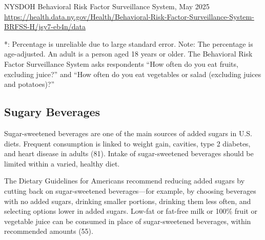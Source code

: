 \documentclass[
  english,
  letterpaper,
]{report}
\begin{document}
\begin{tcolorbox}[enhanced jigsaw, breakable, leftrule=.75mm, title=\textcolor{quarto-callout-note-color}{\faInfo}\hspace{0.5em}{Source}, bottomrule=.15mm, opacityback=0, left=2mm, colback=white, bottomtitle=1mm, coltitle=black, colbacktitle=quarto-callout-note-color!10!white, colframe=quarto-callout-note-color-frame, opacitybacktitle=0.6, toptitle=1mm, titlerule=0mm, arc=.35mm, rightrule=.15mm, toprule=.15mm]

NYSDOH Behavioral Risk Factor Surveillance System, May 2025\\
\url{https://health.data.ny.gov/Health/Behavioral-Risk-Factor-Surveillance-System-BRFSS-H/jsy7-eb4n/data}

\end{tcolorbox}

\begin{tcolorbox}[enhanced jigsaw, breakable, leftrule=.75mm, title=\textcolor{quarto-callout-note-color}{\faInfo}\hspace{0.5em}{Note}, bottomrule=.15mm, opacityback=0, left=2mm, colback=white, bottomtitle=1mm, coltitle=black, colbacktitle=quarto-callout-note-color!10!white, colframe=quarto-callout-note-color-frame, opacitybacktitle=0.6, toptitle=1mm, titlerule=0mm, arc=.35mm, rightrule=.15mm, toprule=.15mm]

*: Percentage is unreliable due to large standard error. Note: The
percentage is age-adjusted. An adult is a person aged 18 years or older.
The Behavioral Risk Factor Surveillance System asks respondents ``How
often do you eat fruits, excluding juice?'' and ``How often do you eat
vegetables or salad (excluding juices and potatoes)?''

\end{tcolorbox}

\subsection{Sugary Beverages}\label{sugary-beverages}

Sugar-sweetened beverages are one of the main sources of added sugars in
U.S. diets. Frequent consumption is linked to weight gain, cavities,
type 2 diabetes, and heart disease in adults (81). Intake of
sugar-sweetened beverages should be limited within a varied, healthy
diet.

The Dietary Guidelines for Americans recommend reducing added sugars by
cutting back on sugar-sweetened beverages---for example, by choosing
beverages with no added sugars, drinking smaller portions, drinking them
less often, and selecting options lower in added sugars. Low-fat or
fat-free milk or 100\% fruit or vegetable juice can be consumed in place
of sugar-sweetened beverages, within recommended amounts (55).
\end{document}
